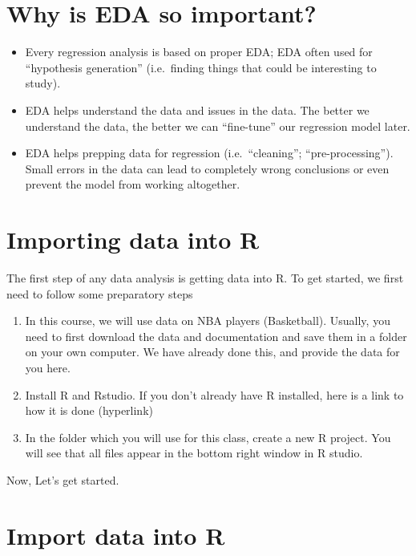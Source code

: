 \documentclass[
]{book}
\providecommand{\tightlist}{%
  \setlength{\itemsep}{0pt}\setlength{\parskip}{0pt}}
\begin{document}
\hypertarget{why-is-eda-so-important}{%
\section{Why is EDA so important?}\label{why-is-eda-so-important}}

\begin{itemize}
\tightlist
\item
  Every regression analysis is based on proper EDA; EDA often used for ``hypothesis generation'' (i.e.~finding things that could be interesting to study).
\item
  EDA helps understand the data and issues in the data. The better we understand the data, the better we can ``fine-tune'' our regression model later.
\item
  EDA helps prepping data for regression (i.e.~``cleaning''; ``pre-processing''). Small errors in the data can lead to completely wrong conclusions or even prevent
  the model from working altogether.
\end{itemize}

\hypertarget{importing-data-into-r}{%
\section{Importing data into R}\label{importing-data-into-r}}

The first step of any data analysis is getting data into R. To get started, we first need to follow some preparatory steps

\begin{enumerate}
\def\labelenumi{\arabic{enumi}.}
\item
  In this course, we will use data on NBA players (Basketball). Usually, you need to first download the data and documentation and save them in a folder on your own computer. We have already done this, and provide the data for you here.
\item
  Install R and Rstudio. If you don't already have R installed, here is a link to how it is done (hyperlink)
\item
  In the folder which you will use for this class, create a new R project. You will see that all files appear in the bottom right window in R studio.
\end{enumerate}

Now, Let's get started.

\hypertarget{import-data-into-r}{%
\section{Import data into R}\label{import-data-into-r}}
\end{document}
